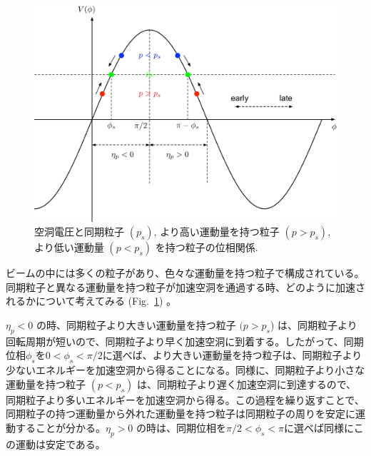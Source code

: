 \documentclass[]{jlreq}
\begin{document}
\begin{figure}[hbt]
  \begin{center}
    \includegraphics[width=15cm,clip]{figs/phase_stability.pdf}
    \caption{空洞電圧と同期粒子 $(p_s)$, より高い運動量を持つ粒子 $(p>p_s)$, より低い運動量 $(p<p_s)$ を持つ粒子の位相関係.}
    \label{phase_stability}
  \end{center}
\end{figure}

ビームの中には多くの粒子があり、色々な運動量を持つ粒子で構成されている。同期粒子と異なる運動量を持つ粒子が加速空洞を通過する時、どのように加速されるかについて考えてみる (Fig.~\ref{phase_stability}) 。

$\eta_p < 0$ の時、同期粒子より大きい運動量を持つ粒子 $(p>p_s$) は、同期粒子より回転周期が短いので、同期粒子より早く加速空洞に到着する。したがって、同期位相$\phi_s$を$0<\phi_s<\pi/2$に選べば、より大きい運動量を持つ粒子は、同期粒子より少ないエネルギーを加速空洞から得ることになる。同様に、同期粒子より小さな運動量を持つ粒子 $(p<p_s)$ は、同期粒子より遅く加速空洞に到達するので、同期粒子より多いエネルギーを加速空洞から得る。この過程を繰り返すことで、同期粒子の持つ運動量から外れた運動量を持つ粒子は同期粒子の周りを安定に運動することが分かる。$\eta_p > 0$ の時は、同期位相を$\pi/2<\phi_s<\pi$に選べば同様にこの運動は安定である。
\end{document}
